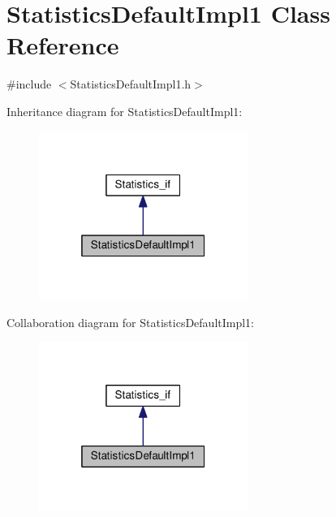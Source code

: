 \hypertarget{class_statistics_default_impl1}{}\section{Statistics\+Default\+Impl1 Class Reference}
\label{class_statistics_default_impl1}


{\ttfamily \#include $<$Statistics\+Default\+Impl1.\+h$>$}



Inheritance diagram for Statistics\+Default\+Impl1\+:\nopagebreak
\begin{figure}[H]
\begin{center}
\leavevmode
\includegraphics[width=193pt]{class_statistics_default_impl1__inherit__graph}
\end{center}
\end{figure}


Collaboration diagram for Statistics\+Default\+Impl1\+:\nopagebreak
\begin{figure}[H]
\begin{center}
\leavevmode
\includegraphics[width=193pt]{class_statistics_default_impl1__coll__graph}
\end{center}
\end{figure}
